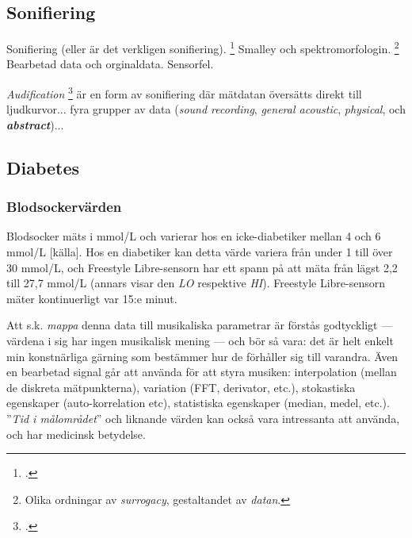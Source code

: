 \documentclass[11pt, twoside, a4paper]{article}
\begin{document}
\begin{multicols}{2}
\subsection*{Sonifiering}
Sonifiering (eller är det verkligen sonifiering). \footcite[2]{bijsterveld_sonic_2019}
Smalley och spektromorfologin. \footnote{Olika ordningar av \emph{surrogacy},  gestaltandet av \emph{datan}.} Bearbetad data och orginaldata. Sensorfel.

\emph{Audification} \footcite[302]{noauthor_sonification_2011} är en form av sonifiering där mätdatan översätts direkt till ljudkurvor... fyra grupper av data (\emph{sound recording}, \emph{general acoustic}, \emph{physical}, och \textbf{\emph{abstract}})...


\subsection*{Diabetes}


\subsubsection*{Blodsockervärden}
Blodsocker mäts i mmol/L och varierar hos en icke-diabetiker mellan 4 och 6 mmol/L [källa]. Hos en diabetiker kan detta värde variera från under 1 till över 30 mmol/L, och Freestyle Libre-sensorn har ett spann på att mäta från lägst 2,2 till 27,7 mmol/L (annars visar den \emph{LO} respektive \emph{HI}). Freestyle Libre-sensorn mäter kontinuerligt var 15:e minut.

Att s.k. \emph{mappa} denna data till musikaliska parametrar är förstås godtyckligt --- värdena i sig har ingen musikalisk mening --- och bör så vara: det är helt enkelt min konstnärliga gärning som bestämmer hur de förhåller sig till varandra. Även en bearbetad signal går att använda för att styra musiken: interpolation (mellan de diskreta mätpunkterna), variation (FFT, derivator, etc.), stokastiska egenskaper (auto-korrelation etc), statistiska egenskaper (median, medel, etc.). ''\emph{Tid i målområdet}'' och liknande värden kan också vara intressanta att använda, och har medicinsk betydelse.


\end{multicols}
\end{document}
